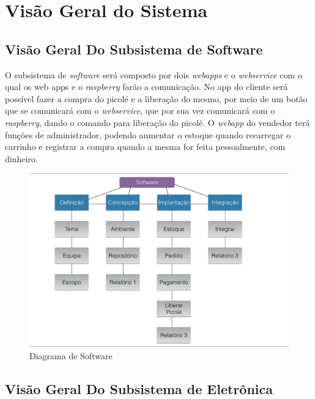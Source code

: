 \chapter{Visão Geral do Sistema}

\section{Visão Geral Do Subsistema de Software}

O subsistema de \textit{software} será composto por dois \textit{webapps} e o \textit{webservice} com o qual os web apps e o \textit{raspberry} farão a comunicação. No app do cliente será possível fazer a compra do picolé e a liberação do mesmo, por meio de um botão que se comunicará com o \textit{webservice}, que por sua vez comunicará com o \textit{raspberry}, dando o comando para liberação do picolé. O \textit{webapp} do vendedor terá funções de administrador, podendo aumentar o estoque quando recarregar o carrinho e registrar a compra quando a mesma for feita pessoalmente, com dinheiro. 

\begin{figure}[H]
	\centering
    \includegraphics[width=\textwidth]{figuras/vg_software}
    \caption{Diagrama de Software}
    \label{fig:vg_software}
\end{figure}


\section{Visão Geral Do Subsistema de Eletrônica}

